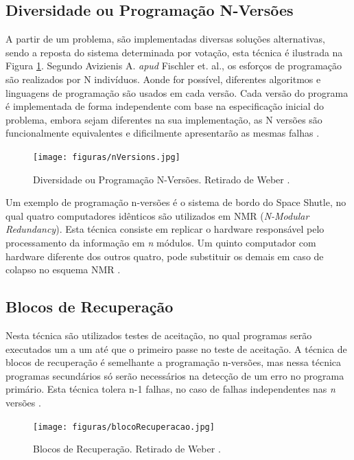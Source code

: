 \documentclass[a4paper,12pt,brazil]{ufms-cpcx}
\begin{document}
\subsection{Diversidade ou Programação N-Versões}

A partir de um problema, são implementadas diversas soluções alternativas, sendo a reposta do sistema determinada por votação, esta técnica é ilustrada na Figura \ref{Img:nVersion}. Segundo Avizienis \cite{Avizienis:1995} A. \textit{apud} Fischler et. al., os esforços de programação são realizados por N indivíduos. Aonde for possível, diferentes algoritmos e linguagens de programação são usados em cada versão. Cada versão do programa é implementada de forma independente com base na especificação inicial do problema, embora sejam diferentes na sua implementação, as N versões são funcionalmente equivalentes e dificilmente apresentarão as mesmas falhas \cite{Avizienis:1995}. 

\begin{figure}[H]
	\centering
	\texttt{[image: figuras/nVersions.jpg]}
	\caption{Diversidade ou Programação N-Versões. Retirado de Weber \cite{Weber:2002}.}
	\label{Img:nVersion}	
\end{figure}  

Um exemplo de programação n-versões é o sistema de bordo do Space Shutle, no qual quatro computadores idênticos são utilizados em NMR (\textit{N-Modular Redundancy}). Esta técnica consiste em replicar o hardware responsável pelo processamento da informação em \textit{n} módulos. Um quinto computador com hardware diferente dos outros quatro, pode substituir os demais em caso de colapso no esquema NMR \cite{Pradhan:1996}.

\subsection{Blocos de Recuperação}

Nesta técnica são utilizados testes de aceitação, no qual programas serão executados um a um até que o primeiro passe no teste de aceitação. A técnica de blocos de recuperação é semelhante a programação n-versões, mas nessa técnica programas secundários só serão necessários na detecção de um erro no programa primário. Esta técnica tolera n-1 falhas, no caso de falhas independentes nas \textit{n} versões \cite{Nelson:1990, Weber:2002, Somani:1997}.   

\begin{figure}[H]
	\centering
	\texttt{[image: figuras/blocoRecuperacao.jpg]}
	\caption{Blocos de Recuperação. Retirado de Weber \cite{Weber:2002}.}
	\label{Img:blocoRecuperacao}	
\end{figure}
\end{document}
